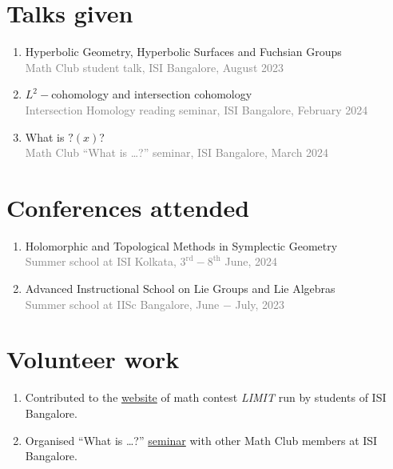 \documentclass[a4paper, oneside, final]{scrartcl} %
\begin{document}
\section{Talks given}

\begin{enumerate}[label = $\bullet$]
  \item Hyperbolic Geometry, Hyperbolic Surfaces and Fuchsian Groups \\
    \textcolor{grey}{Math Club student talk, ISI Bangalore, August 2023}
  \item \( L^2- \)cohomology and intersection cohomology \\
    \textcolor{grey}{Intersection Homology reading seminar, ISI Bangalore, February 2024}
  \item What is \( ?(x) \)? \\
    \textcolor{grey}{Math Club ``What is \dots ?'' seminar, ISI Bangalore, March 2024}
\end{enumerate}

\section{Conferences attended}

\begin{enumerate}[label = $\bullet$]
  \item Holomorphic and Topological Methods in Symplectic Geometry \\
    \textcolor{grey}{Summer school at ISI Kolkata, \( {3}^{\text{rd}} -  {8}^{\text{th}} \) June, 2024}
  \item Advanced Instructional School on Lie Groups and Lie Algebras \\
    \textcolor{grey}{Summer school at IISc Bangalore, June \( - \) July, 2023}
\end{enumerate}

\section{Volunteer work}

\begin{enumerate}[label = $\bullet$]
  \item Contributed to the \href{https://www.limitisi.in}{website} of math contest \textit{LIMIT} run by students of ISI Bangalore.
  \item Organised ``What is \dots ?'' \href{https://mathclubisib.github.io/seminars/what_is/}{seminar} with other Math Club members at ISI Bangalore.

\end{enumerate}

\end{document}
